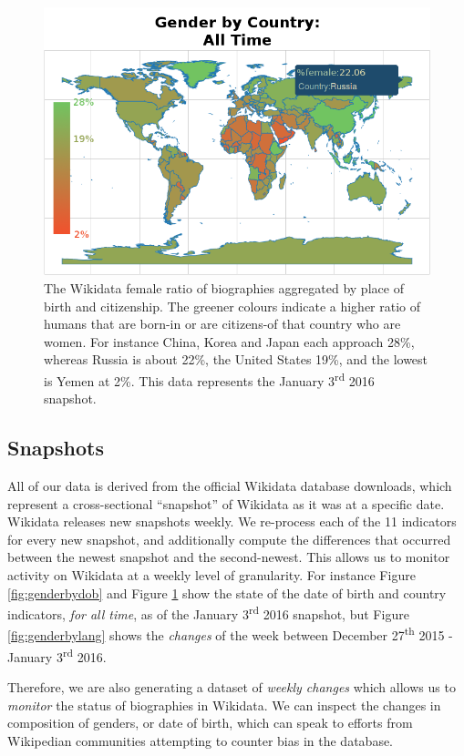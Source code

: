 \documentclass{sig-alternate-05-2015}
\begin{document}
\begin{figure}
\includegraphics[width=\columnwidth]{figures/genderbycountry.png} 
\caption{The Wikidata female ratio of biographies aggregated by place of birth and citizenship. The greener colours indicate a higher ratio of humans that are born-in or are citizens-of that country who are women. For instance China, Korea and Japan each approach 28\%, whereas Russia is about 22\%, the United States 19\%, and the lowest is Yemen at 2\%. This data represents the January 3\textsuperscript{rd} 2016 snapshot.}
\label{fig:genderbycountry}
\end{figure}


\subsection{Snapshots}
All of our data is derived from the official Wikidata database downloads, which represent a cross-sectional ``snapshot'' of Wikidata as it was at a specific date. Wikidata releases new snapshots weekly. We re-process each of the 11 indicators for every new snapshot, and additionally compute the differences that occurred between the newest snapshot and the second-newest. This allows us to monitor activity on Wikidata at a weekly level of granularity. For instance Figure  \ref{fig:genderbydob} and Figure \ref{fig:genderbycountry} show the state of the date of birth and country indicators, \textit{for all time}, as of the January 3\textsuperscript{rd} 2016 snapshot, but Figure \ref{fig:genderbylang} shows the \textit{changes} of the week between December 27\textsuperscript{th} 2015 - January 3\textsuperscript{rd} 2016.

Therefore, we are also generating a dataset of \textit{weekly changes} which allows us to \textit{monitor} the status of biographies in Wikidata. We can inspect the changes in composition of genders, or date of birth, which can speak to efforts from Wikipedian communities attempting to counter bias in the database. 
\end{document}

